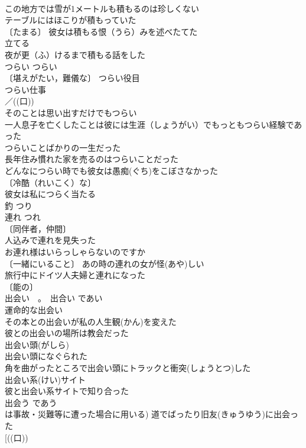 \documentclass[8pt]{extreport}
\begin{document}
\begin{CJK}{UTF8}{min}
\\	この地方では雪が1メートルも積もるのは珍しくない 
\\	テーブルにはほこりが積もっていた 
\\	〔たまる〕 彼女は積もる恨（うら）みを述べたてた 
\\	立てる 
\\	夜が更（ふ）けるまで積もる話をした 
\\	つらい	つらい	
\\	〔堪えがたい，難儀な〕 つらい役目 
\\	つらい仕事 
\\	／((口))
\\	そのことは思い出すだけでもつらい 
\\	一人息子を亡くしたことは彼には生涯（しょうがい）でもっともつらい経験であった 
\\	つらいことばかりの一生だった 
\\	長年住み慣れた家を売るのはつらいことだった 
\\	どんなにつらい時でも彼女は愚痴(ぐち)をこぼさなかった 
\\	〔冷酷（れいこく）な〕
\\	彼女は私につらく当たる 
\\	釣	つり	
\\	連れ	つれ	
\\	〔同伴者，仲間〕
\\	人込みで連れを見失った 
\\	お連れ様はいらっしゃらないのですか 
\\	〔一緒にいること〕 あの時の連れの女が怪(あや)しい 
\\	旅行中にドイツ人夫婦と連れになった 
\\	〔能の〕
\\	出会い　。　出合い	であい	
\\	運命的な出会い 
\\	その本との出会いが私の人生観(かん)を変えた 
\\	彼との出会いの場所は教会だった 
\\	出会い頭(がしら) 
\\	出会い頭になぐられた 
\\	角を曲がったところで出会い頭にトラックと衝突(しょうとつ)した 
\\	出会い系(けい)サイト 
\\	彼と出会い系サイトで知り合った 
\\	出会う	であう	
\\	は事故・災難等に遭った場合に用いる) 道でばったり旧友(きゅうゆう)に出会った 
\\	[((口))

\end{CJK}
\end{document}
